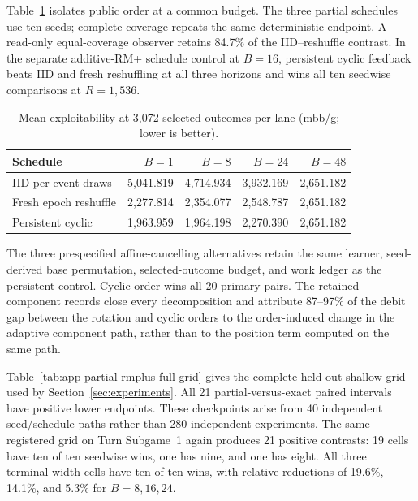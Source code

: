 Table~\ref{tab:temporal-balance} isolates public order at a common budget.
The three partial schedules use ten seeds; complete coverage repeats the same
deterministic endpoint.  A read-only equal-coverage observer retains 84.7\%
of the IID--reshuffle contrast.  In the separate additive-RM+ schedule
control at $B=16$, persistent cyclic feedback beats IID and fresh reshuffling
at all three horizons and wins all ten seedwise comparisons at
$R=1{,}536$.

\begin{table}[h]
\caption{Mean exploitability at 3,072 selected outcomes per lane (mbb/g;
lower is better).}
\label{tab:temporal-balance}
\centering\small
\begin{tabular}{@{}lrrrr@{}}
\toprule
Schedule & $B=1$ & $B=8$ & $B=24$ & $B=48$ \\
\midrule
IID per-event draws & 5,041.819 & 4,714.934 & 3,932.169 & 2,651.182 \\
Fresh epoch reshuffle & 2,277.814 & 2,354.077 & 2,548.787 & 2,651.182 \\
Persistent cyclic & 1,963.959 & 1,964.198 & 2,270.390 & 2,651.182 \\
\bottomrule
\end{tabular}
\end{table}

The three prespecified affine-cancelling alternatives retain the same
learner, seed-derived base permutation, selected-outcome budget, and work
ledger as the persistent control.  Cyclic order wins all 20 primary pairs.
The retained component records close every decomposition and attribute
87--97\% of the debit gap between the rotation and cyclic orders to the
order-induced change in the adaptive component path, rather than to the
position term computed on the same path.

Table~\ref{tab:app-partial-rmplus-full-grid} gives the complete held-out
shallow grid used by Section~\ref{sec:experiments}.  All 21 partial-versus-exact
paired intervals have positive lower endpoints.  These checkpoints arise
from 40 independent seed/schedule paths rather than 280 independent
experiments.  The same registered grid on Turn Subgame~1 again produces 21
positive contrasts: 19 cells have ten of ten seedwise wins, one has nine, and
one has eight.  All three terminal-width cells have ten of ten wins, with
relative reductions of 19.6\%, 14.1\%, and 5.3\% for $B=8,16,24$.

